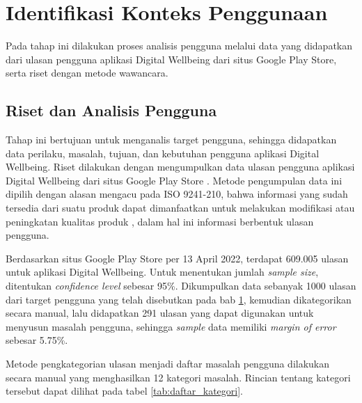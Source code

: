 
\section{Identifikasi Konteks Penggunaan}
\label{sec:identifikasi_konteks_penggunaan}

Pada tahap ini dilakukan proses analisis pengguna melalui data yang didapatkan dari ulasan pengguna aplikasi Digital Wellbeing dari situs Google Play Store, serta riset dengan metode wawancara.

\subsection{Riset dan Analisis Pengguna}

Tahap ini bertujuan untuk menganalis target pengguna, sehingga didapatkan data perilaku, masalah, tujuan, dan kebutuhan pengguna aplikasi Digital Wellbeing. Riset dilakukan dengan mengumpulkan data ulasan pengguna aplikasi Digital Wellbeing dari situs Google Play Store \textcite{dwplaystorereviews}. Metode pengumpulan data ini dipilih dengan alasan mengacu pada ISO 9241-210, bahwa informasi yang sudah tersedia dari suatu produk dapat dimanfaatkan untuk melakukan modifikasi atau peningkatan kualitas produk \parencite{iso9241-210:2010}, dalam hal ini informasi berbentuk ulasan pengguna.

Berdasarkan situs Google Play Store per 13 April 2022, terdapat 609.005 ulasan untuk aplikasi Digital Wellbeing. Untuk menentukan jumlah \textit{sample size}, ditentukan \textit{confidence level} sebesar 95\%. Dikumpulkan data sebanyak 1000 ulasan dari target pengguna yang telah disebutkan pada bab \ref{sec:identifikasi_konteks_penggunaan},  kemudian dikategorikan secara manual, lalu didapatkan 291 ulasan yang dapat digunakan untuk menyusun masalah pengguna, sehingga \textit{sample} data memiliki \textit{margin of error} sebesar 5.75\%.

Metode pengkategorian ulasan menjadi daftar masalah pengguna dilakukan secara manual yang menghasilkan 12 kategori masalah. Rincian tentang kategori tersebut dapat dilihat pada tabel \ref{tab:daftar_kategori}.

